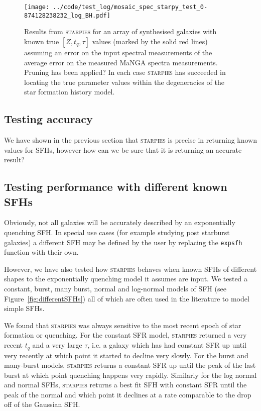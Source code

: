 \documentclass[useAMS,usenatbib]{mn2e}
\def\check		{\color{check}}
\begin{document}
\begin{figure*}
\centering
\texttt{[image: ../code/test\_log/mosaic\_spec\_starpy\_test\_0-874128238232\_log\_BH.pdf]}
\caption{Results from \textsc{starpies} for an array of synthesised galaxies with known true $[Z, t_q, \tau]$ values (marked by the solid red lines) assuming an error on the input spectral measurements of the average error on the measured MaNGA spectra measurements. {\check Pruning has been applied?} In each case \textsc{starpies} has succeeded in locating the true parameter values within the degeneracies of the star formation history model.}
\label{fig:test_mosaic}
\end{figure*}

\subsection{Testing accuracy}

We have shown in the previous section that \textsc{starpies} is precise in returning known values for SFHs, however how can we be sure that it is returning an accurate result? 

\subsection{Testing performance with different known SFHs}

Obviously, not all galaxies will be accurately described by an exponentially quenching SFH. In special use cases (for example studying post starburst galaxies) a different SFH may be defined by the user by replacing the \texttt{expsfh} function with their own. 

However, we have also tested how \textsc{starpies} behaves when known SFHs of different shapes to the exponentially quenching model it assumes are input. We tested a constant, burst, many burst, normal and log-normal models of SFH (see Figure~\ref{fig:differentSFHs}) all of which are often used in the literature to model simple SFHs. 

We found that \textsc{starpies} was always sensitive to the most recent epoch of star formation or quenching. For the constant SFR model, \textsc{starpies} returned a very recent $t_q$ and a very large $\tau$, i.e. a galaxy which has had constant SFR up until very recently at which point it started to decline very slowly. For the burst and many-burst models, \textsc{starpies} returns a constant SFR up until the peak of the last burst at which point quenching happens very rapidly. Similarly for the log normal and normal SFHs, \textsc{starpies} returns a best fit SFH with constant SFR until the peak of the normal and which point it declines at a rate comparable to the drop off of the Gaussian SFH. 
\end{document}
